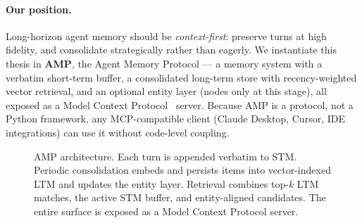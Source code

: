 \paragraph{Our position.} Long-horizon agent memory should be \emph{context-first}: preserve turns at high fidelity, and consolidate strategically rather than eagerly. We instantiate this thesis in \textbf{AMP}, the Agent Memory Protocol --- a memory system with a verbatim short-term buffer, a consolidated long-term store with recency-weighted vector retrieval, and an optional entity layer (nodes only at this stage), all exposed as a Model Context Protocol~\citep{anthropic2024mcp} server. Because AMP is a protocol, not a Python framework, any MCP-compatible client (Claude Desktop, Cursor, IDE integrations) can use it without code-level coupling.

\begin{figure}[t]
\centering

\caption{AMP architecture. Each turn is appended verbatim to STM. Periodic consolidation embeds and persists items into vector-indexed LTM and updates the entity layer. Retrieval combines top-$k$ LTM matches, the active STM buffer, and entity-aligned candidates. The entire surface is exposed as a Model Context Protocol server.}
\label{fig:arch}
\end{figure}


